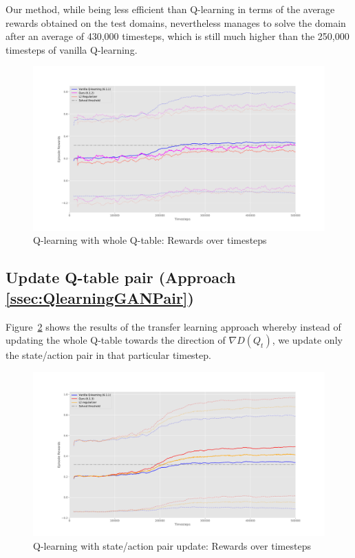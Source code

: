 Our method, while being less efficient than Q-learning in terms of the average rewards obtained on the test domains, nevertheless manages to solve the domain after an average of 430,000 timesteps, which is still much higher than the 250,000 timesteps of vanilla Q-learning.

\begin{figure}[H]
\centering
\includegraphics[width=15cm]{Figures/QlearningGANWholeBench}
\caption{Q-learning with whole Q-table: Rewards over timesteps}
\label{fig:QlearningGANWholeBench}
\end{figure}


\subsection{Update Q-table pair (Approach \ref{ssec:QlearningGANPair})}
Figure~\ref{fig:QlearningGANPairBench} shows the results of the transfer learning approach whereby instead of updating the whole Q-table towards the direction of $\nabla D(Q_{t})$, we update only the state/action pair in that particular timestep.

\begin{figure}[H]
\centering
\includegraphics[width=15cm]{Figures/QlearningGANPairBench}
\caption{Q-learning with state/action pair update: Rewards over timesteps}
\label{fig:QlearningGANPairBench}
\end{figure}

